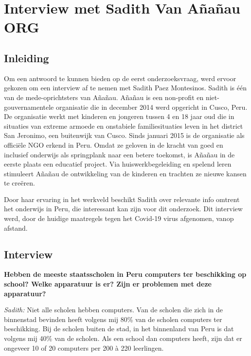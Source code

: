 
\chapter{Interview met Sadith Van Añañau ORG}
\label{ch:interviewSadith}

\section{Inleiding}
Om een antwoord te kunnen bieden op de eerst onderzoeksvraag, werd ervoor gekozen om een interview af te nemen met Sadith Paez Montesinos. Sadith is één van de mede-oprichtsters van Añañau. Añañau is een non-profit en niet-gouvernamentele organisatie die in december 2014 werd opgericht in Cusco, Peru. De organisatie werkt met kinderen en jongeren tussen 4 en 18 jaar oud die in situaties van extreme armoede en onstabiele familiesituaties leven in het district San Jeronimo, een buitenwijk van Cusco. Sinds januari 2015 is de organisatie als officiële NGO erkend in Peru. Omdat ze geloven in de kracht van goed en inclusief onderwijs als springplank naar een betere toekomst, is Añañau in de eerste plaats een educatief project. Via huiswerkbegeleiding en spelend leren stimuleert Añañau de ontwikkeling van de kinderen en trachten ze nieuwe kansen te creëren. \autocite{Ananau2020}

Door haar ervaring in het werkveld beschikt Sadith over relevante info omtrent het onderwijs in Peru, die interessant kan zijn voor dit onderzoek. Dit interview werd, door de huidige maatregels tegen het Covid-19 virus afgenomen, vanop afstand.

\section{Interview}
\textbf{Hebben de meeste staatsscholen in Peru computers ter beschikking op school? Welke apparatuur is er? Zijn er problemen met deze apparatuur?}

\textit{Sadith:} Niet alle scholen hebben computers. Van de scholen die zich in de binnenstad bevinden heeft volgens mij 80\% van de scholen computers ter beschikking. Bij de scholen buiten de stad, in het binnenland van Peru is dat volgens mij 40\% van de scholen. Als een school dan computers heeft, zijn dat er ongeveer 10 of 20 computers per 200 à 220 leerlingen.

